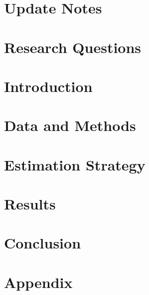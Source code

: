 \documentclass[lang=en, 12pt, a4paper, cite=super, chinesefont=Mac-default]{elegantpaper}
\begin{document}
{	\newpage
    \tableofcontents
    \setcounter{page}{1}
	\newpage

	\newpage
    \section*{Update Notes} 
    \label{Update Notes}
    
	\newpage
	\section{Research Questions} 
	\label{Research Questions}
	
	\newpage
	\section{Introduction} 
	\label{Introduction}
	
    \newpage
    \section{Data and Methods} 
    \label{Data and Methods}
    
    \newpage
    \section{Estimation Strategy}
    \label{Estimation Strategy}
    
    \newpage
    \section{Results}
    \label{Results}
    
	\newpage
	\section{Conclusion} 
	\label{Conclusion}
	
	\newpage
	\appendix
	\section{Appendix}
	\label{Appendix}
	
	
	\newpage
    \printbibliography[heading=bibintoc, title=\ebibname]
    \appendix
    \addappheadtotoc

}
\end{document}
